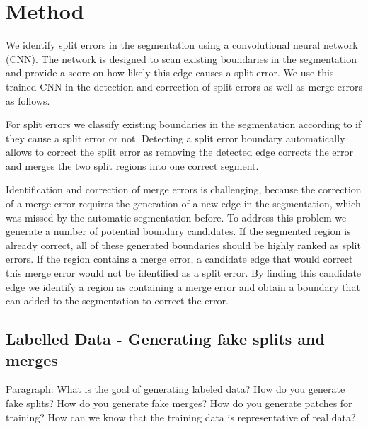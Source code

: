 \section{Method}
We identify split errors in the segmentation using a convolutional neural network (CNN). The network is designed to scan existing boundaries in the segmentation and provide a score on how likely this edge causes a split error. We use this trained CNN in the detection and correction of split errors as well as merge errors as follows.

For split errors we classify existing boundaries in the segmentation according to if they cause a split error or not. Detecting a split error boundary automatically allows to correct the split error as removing the detected edge corrects the error and merges the two split regions into one correct segment. 

Identification and correction of merge errors is challenging, because the correction of a merge error requires the generation of a new edge in the segmentation, which was missed by the automatic segmentation before. To address this problem we generate a number  of potential boundary candidates. If the segmented region is already correct, all of these generated boundaries should be highly ranked as split errors. If the region contains a merge error, a candidate edge that would correct this merge error would not be identified as a split error. By finding this candidate edge we identify a region as containing a merge error and obtain a boundary that can added to the segmentation to correct the error. 

\subsection{Labelled Data - Generating fake splits and merges}

Paragraph: What is the goal of generating labeled data? How do you generate fake splits? How do you generate fake merges? How do you generate patches for training? How can we know that the training data is representative of real data?

